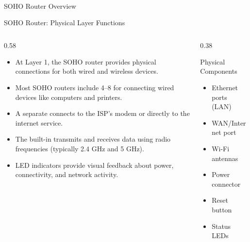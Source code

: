 \documentclass[aspectratio=169]{beamer}  %
\begin{document}
\begin{frame}{SOHO Router Overview}
\begin{center}
    \end{center}
\end{frame}

\begin{frame}{SOHO Router: Physical Layer Functions}
    \begin{columns}[T]
        \begin{column}{0.58\textwidth}
            \begin{itemize}
                \item At Layer 1, the SOHO router provides physical connections for both wired and wireless devices.
                \item Most SOHO routers include 4--8  for connecting wired devices like computers and printers.
                \item A separate  connects to the ISP's modem or directly to the internet service.
                \item The built-in  transmits and receives data using radio frequencies (typically 2.4 GHz and 5 GHz).
                \item LED indicators provide visual feedback about power, connectivity, and network activity.
            \end{itemize}
        \end{column}
        \begin{column}{0.38\textwidth}
            \begin{block}{Physical Components}
                \begin{itemize}
                    \item Ethernet ports (LAN)
                    \item WAN/Internet port
                    \item Wi-Fi antennas
                    \item Power connector
                    \item Reset button
                    \item Status LEDs
                \end{itemize}
            \end{block}
            

\end{column}
\end{columns}
\end{frame}
\end{document}

